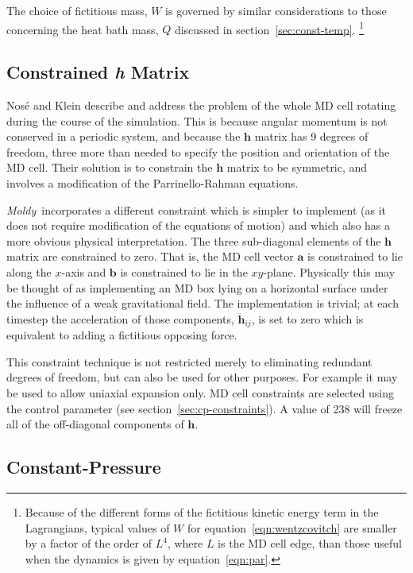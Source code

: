 \documentclass[a4paper,twoside]{report}
\providecommand{\bm}[1]{\mathbf{#1}}
\newcommand{\moldy}{\emph{Moldy}}
\begin{document}
The choice of fictitious mass, $W$ is governed by similar
considerations to those concerning the heat bath mass, $Q$ discussed
in section~\ref{sec:const-temp}.  \footnote{Because of the
different forms of the fictitious kinetic energy term in the
Lagrangians, typical values of $W$ for equation~\ref{eqn:wentzcovitch}
are smaller by a factor of the order of $L^4$, where $L$ is the MD
cell edge, than those useful when the dynamics is given by
equation~\ref{eqn:par}.}

\subsection{Constrained \textit{\textbf{h}} Matrix}
Nos\'{e} and Klein\cite{nose:83} describe and address the problem of
the whole MD cell rotating during the course of the simulation.  This
is because angular momentum is not conserved in a periodic system, and
because the $\bm{h}$ matrix has 9 degrees of freedom, three more than
needed to specify the position and orientation of the MD cell.  Their
solution is to constrain the $\bm{h}$ matrix to be symmetric, and
involves a modification of the Parrinello-Rahman equations.

\moldy\ incorporates a different constraint which is 
simpler to implement (as it does not require modification of the
equations of motion) and which also has a more obvious physical
interpretation.  The three sub-diagonal elements of the $\bm{h}$
matrix are constrained to zero.  That is, the MD cell vector
$\bm{a}$ is constrained to lie along the $x$-axis and $\bm{b}$ is
constrained to lie in the $xy$-plane.  Physically this may be thought
of as implementing an MD box lying on a horizontal surface under the
influence of a weak gravitational field.  The implementation is
trivial; at each timestep the acceleration of those components,
$\ddot{\bm{h}}_{ij}$, is set to zero which is equivalent to adding a
fictitious opposing force.

This constraint technique is not restricted merely to eliminating
redundant degrees of freedom, but can also be used for other purposes.
For example it may be used to allow uniaxial expansion only.  
MD cell constraints are selected using the control parameter
 (see section~\ref{sec:cp-constraints}).  A value of
238 will freeze all of the off-diagonal components of $\bm{h}$.

\subsection{Constant-Pressure}
\end{document}
